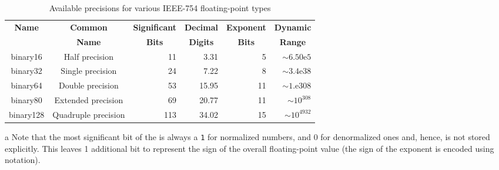 \begin{table}[h!] 
\begin{center}
\begin{threeparttable}
\caption{Available precisions for various IEEE-754 floating-point types}\label{digitseparator-table3}\vspace{1.5ex} 
{\small \begin{tabular}{c|c|c|c|c|c}\thickhline 
\rowcolor[gray]{.9}   {\sffamily\bfseries Name} & {\sffamily\bfseries Common} &
{\sffamily\bfseries Significant } & {\sffamily\bfseries Decimal }& {\sffamily\bfseries Exponent } & {\sffamily\bfseries Dynamic}\\
\rowcolor[gray]{.9}    & {\sffamily\bfseries Name} &
{\sffamily\bfseries Bits\tnote{a}} & {\sffamily\bfseries Digits}& {\sffamily\bfseries Bits} & {\sffamily\bfseries Range}\\ \hline 
binary16 & Half precision & \multicolumn{1}{r|}{11} & \multicolumn{1}{r|}{3.31} & \multicolumn{1}{r|}{5} & \multicolumn{1}{r}{$\sim6.50\text{e}5$}\\ \hline
binary32 & Single precision & \multicolumn{1}{r|}{24} & \multicolumn{1}{r|}{7.22} & \multicolumn{1}{r|}{8} & \multicolumn{1}{r}{$\sim3.4\text{e}38$}\\ \hline
binary64 & Double precision & \multicolumn{1}{r|}{53} & \multicolumn{1}{r|}{15.95} & \multicolumn{1}{r|}{11} & \multicolumn{1}{r}{$\sim1.\text{e}308$}\\ \hline
\rule{0pt}{3.5mm}binary80 & Extended precision & \multicolumn{1}{r|}{69} & \multicolumn{1}{r|}{20.77} & \multicolumn{1}{r|}{11} & \multicolumn{1}{r}{$\sim10^{308}$}\\ \hline
\rule{0pt}{3.5mm}binary128 & Quadruple precision & \multicolumn{1}{r|}{113} & \multicolumn{1}{r|}{34.02} & \multicolumn{1}{r|}{15} & \multicolumn{1}{r}{$\sim10^{4932}$}\\ \hline
\end{tabular}
} %
\begin{tablenotes}{\footnotesize  
\item[a]{Note that the most significant bit of the 
is always a \lstinline!1! for normalized numbers, and 0 for denormalized ones and, hence, is not stored explicitly. This leaves 1
additional bit to represent the sign of the overall floating-point value
(the sign of the exponent is encoded using 
notation).} 
} %
\end{tablenotes} %
\end{threeparttable} 
\end{center}
\end{table}

